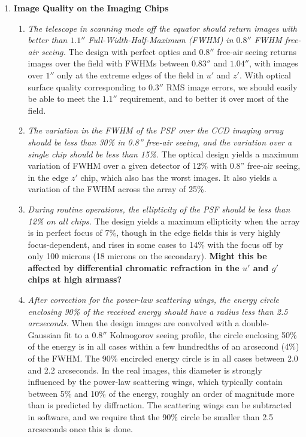 \begin{enumerate} 
\item {\bf Image Quality on the Imaging Chips}
\begin{enumerate} 
\item {\it The telescope in scanning mode off the equator
should return images with better than $1.1''$ Full-Width-Half-Maximum
(FWHM) in $0.8''$ FWHM free-air seeing.}  The design with perfect optics
and $0.8''$ free-air seeing returns images over the field with FWHMs
between $0.83''$ and $1.04''$, 
with images over $1''$ only at the extreme edges of the field in $u'$
and $z'$.  With optical surface quality corresponding to $0.3''$ RMS
image errors, we should easily be able to meet the $1.1''$ requirement,
and to better it over most of the field.  
\item  {\it The variation in the FWHM of the PSF over the CCD imaging array
should be less than 30\% in 0.8'' free-air seeing, and the variation
over a single chip should be less than 15\%.}  The optical design yields a maximum
variation of FWHM over a given detector of 12\% with 0.8'' free-air
seeing, in the edge $z'$ chip, which also has the worst images.  It
also yields a  variation of the FWHM across the array of 25\%. 


\item {\it During routine operations, the ellipticity of the PSF
should be less than 12\% on all chips.}
The design yields a maximum ellipticity when the array is in perfect
focus of 7\%, though in the edge fields this is very highly
focus-dependent, and rises in some cases to 14\% with the focus off by
only 100 microns (18 microns on the secondary).  {\bf Might this be
affected by differential chromatic refraction in the $u'$ and $g'$
chips at high airmass?} 
\item {\it After correction for the power-law scattering wings, the
energy circle enclosing 90\% of the received energy should have a
radius less than 2.5 arcseconds.} 
When the design images are convolved with a double-Gaussian fit to a
$0.8''$ Kolmogorov seeing profile, the 
circle enclosing 50\% of the energy is in all cases within a few
hundredths of an arcsecond (4\%) of the FWHM. The 90\% encircled energy 
circle is in all cases between 2.0 and 2.2 arcseconds. In the real images,
this diameter is strongly influenced by the power-law scattering wings,
which typically contain between 5\% and 10\% of the energy, roughly an
order of magnitude more than is predicted by diffraction. The
scattering wings can be subtracted in software, and we require that the 90\%
circle be smaller than 2.5 arcseconds once this is done.
\end{enumerate}


\end{enumerate}
